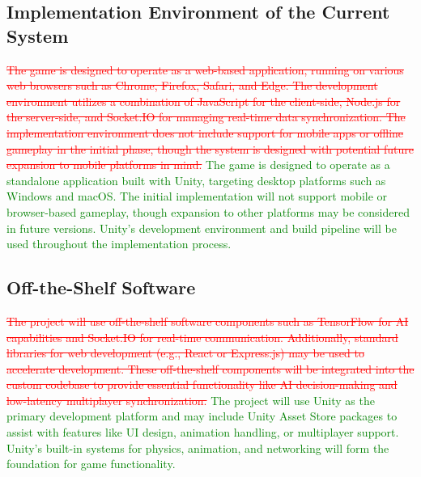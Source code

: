 \documentclass[12pt]{article}
\newcommand{\removed}[1]{\textcolor{red}{\sout{#1}}}
\newcommand{\added}[1]{\textcolor{green}{#1}}
\begin{document}
\subsection{Implementation Environment of the Current System}
\removed{The game is designed to operate as a web-based application, running on various web browsers such as Chrome, Firefox, Safari, and Edge. The development environment utilizes a combination of JavaScript for the client-side, Node.js for the server-side, and Socket.IO for managing real-time data synchronization. The implementation environment does not include support for mobile apps or offline gameplay in the initial phase, though the system is designed with potential future expansion to mobile platforms in mind.}
\added{The game is designed to operate as a standalone application built with Unity, targeting desktop platforms such as Windows and macOS. The initial implementation will not support mobile or browser-based gameplay, though expansion to other platforms may be considered in future versions. Unity’s development environment and build pipeline will be used throughout the implementation process.}

\subsection{Off-the-Shelf Software}
\removed{The project will use off-the-shelf software components such as TensorFlow for AI capabilities and Socket.IO for real-time communication. Additionally, standard libraries for web development (e.g., React or Express.js) may be used to accelerate development. These off-the-shelf components will be integrated into the custom codebase to provide essential functionality like AI decision-making and low-latency multiplayer synchronization.}
\added{The project will use Unity as the primary development platform and may include Unity Asset Store packages to assist with features like UI design, animation handling, or multiplayer support. Unity’s built-in systems for physics, animation, and networking will form the foundation for game functionality.}
\end{document}
